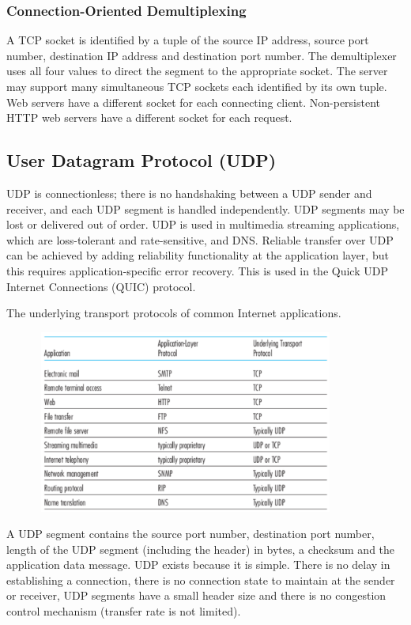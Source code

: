 \subsubsection{Connection-Oriented Demultiplexing}

A TCP socket is identified by a tuple of the source IP address, source port number, destination IP address and destination port number.
The demultiplexer uses all four values to direct the segment to the appropriate socket.
The server may support many simultaneous TCP sockets each identified by its own tuple.
Web servers have a different socket for each connecting client.
Non-persistent HTTP web servers have a different socket for each request.

\subsection{User Datagram Protocol (UDP)}

UDP is connectionless; there is no handshaking between a UDP sender and receiver, and each UDP segment is handled independently.
UDP segments may be lost or delivered out of order.
UDP is used in multimedia streaming applications, which are loss-tolerant and rate-sensitive, and DNS.
Reliable transfer over UDP can be achieved by adding reliability functionality at the application layer, but this requires application-specific error recovery.
This is used in the Quick UDP Internet Connections (QUIC) protocol.

\begin{table}[htp]
  \centering
  \caption*{The underlying transport protocols of common Internet applications.}
  \includegraphics[width=12cm,height=6cm]{unit-18/figures/common-transport-protocols.png}
\end{table}

A UDP segment contains the source port number, destination port number, length of the UDP segment (including the header) in bytes, a checksum and the application data message.
UDP exists because it is simple.
There is no delay in establishing a connection, there is no connection state to maintain at the sender or receiver, UDP segments have a small header size and there is no congestion control mechanism (transfer rate is not limited).

